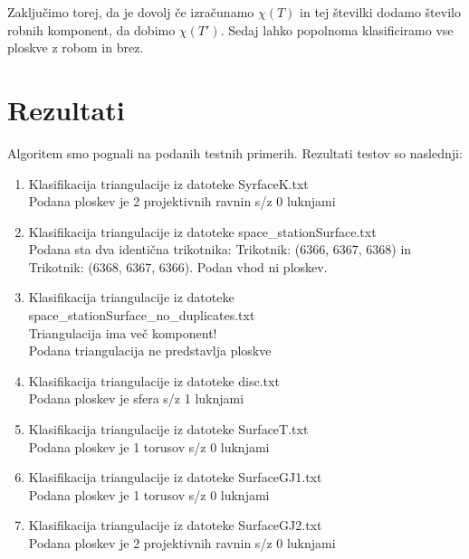 \documentclass{article}
\begin{document}
Zaključimo torej, da je dovolj če izračunamo $\chi(T)$ in tej številki dodamo število robnih komponent, da dobimo $\chi(T')$. Sedaj lahko popolnoma klasificiramo vse ploskve z robom in brez.


\section{Rezultati}
Algoritem smo pognali na podanih testnih primerih. Rezultati testov so naslednji:
\begin{enumerate}
\item Klasifikacija triangulacije iz datoteke SyrfaceK.txt \\
	Podana ploskev je 2 projektivnih ravnin s/z 0 luknjami
\item Klasifikacija triangulacije iz datoteke space\_stationSurface.txt \\
	Podana sta dva identična trikotnika: Trikotnik: (6366, 6367, 6368) in Trikotnik: (6368, 6367, 6366). Podan vhod ni ploskev.
\item Klasifikacija triangulacije iz datoteke space\_stationSurface\_no\_duplicates.txt \\
	Triangulacija ima več komponent! \\
	Podana triangulacija ne predstavlja ploskve
\item Klasifikacija triangulacije iz datoteke disc.txt \\
	Podana ploskev je sfera s/z 1 luknjami
\item Klasifikacija triangulacije iz datoteke SurfaceT.txt \\
	Podana ploskev je 1 torusov s/z 0 luknjami
\item Klasifikacija triangulacije iz datoteke SurfaceGJ1.txt \\
	Podana ploskev je 1 torusov s/z 0 luknjami
\item Klasifikacija triangulacije iz datoteke SurfaceGJ2.txt \\
	Podana ploskev je 2 projektivnih ravnin s/z 0 luknjami
\end{enumerate}

\end{document}
